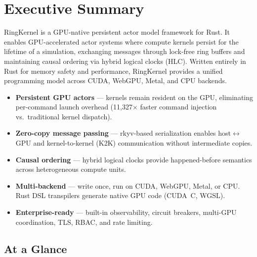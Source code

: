 \documentclass[11pt,a4paper]{article}
\begin{document}
\tableofcontents
\newpage

\section{Executive Summary}

RingKernel is a GPU-native persistent actor model framework for Rust. It
enables GPU-accelerated actor systems where compute kernels persist for the
lifetime of a simulation, exchanging messages through lock-free ring buffers
and maintaining causal ordering via hybrid logical clocks (HLC). Written
entirely in Rust for memory safety and performance, RingKernel provides a
unified programming model across CUDA, WebGPU, Metal, and CPU backends.

\begin{tcolorbox}[keybox={Why RingKernel?}]
\begin{itemize}[leftmargin=1.2em, itemsep=3pt]
  \item \textbf{Persistent GPU actors} --- kernels remain resident on the GPU,
        eliminating per-command launch overhead (11,327$\times$ faster command
        injection vs.\ traditional kernel dispatch).
  \item \textbf{Zero-copy message passing} --- rkyv-based serialization enables
        host$\leftrightarrow$GPU and kernel-to-kernel (K2K) communication without
        intermediate copies.
  \item \textbf{Causal ordering} --- hybrid logical clocks provide happened-before
        semantics across heterogeneous compute units.
  \item \textbf{Multi-backend} --- write once, run on CUDA, WebGPU, Metal, or CPU.
        Rust DSL transpilers generate native GPU code (CUDA~C, WGSL).
  \item \textbf{Enterprise-ready} --- built-in observability, circuit breakers,
        multi-GPU coordination, TLS, RBAC, and rate limiting.
\end{itemize}
\end{tcolorbox}

\subsection{At a Glance}
\end{document}
